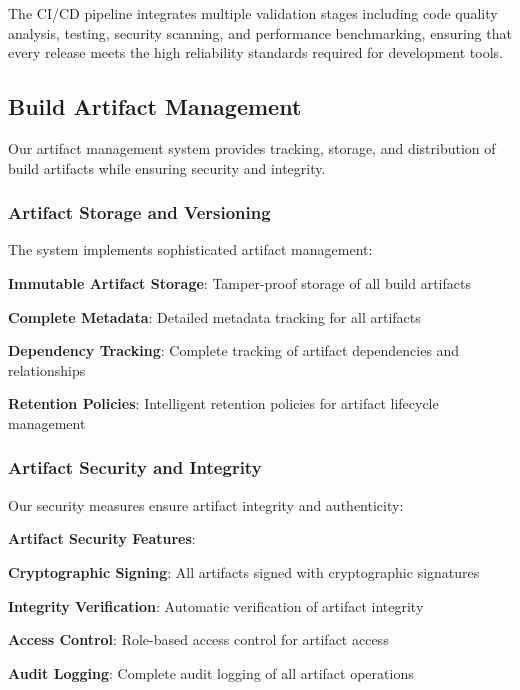 \begin{infobox}[title=CI/CD Pipeline Architecture]
The CI/CD pipeline integrates multiple validation stages including code quality analysis, testing, security scanning, and performance benchmarking, ensuring that every release meets the high reliability standards required for development tools.
\end{infobox}

\subsection*{Build Artifact Management}

Our artifact management system provides tracking, storage, and distribution of build artifacts while ensuring security and integrity.

\subsubsection*{Artifact Storage and Versioning}

The system implements sophisticated artifact management:

\begin{compactlist}
    \item \textbf{Immutable Artifact Storage}: Tamper-proof storage of all build artifacts
    \item \textbf{Complete Metadata}: Detailed metadata tracking for all artifacts
    \item \textbf{Dependency Tracking}: Complete tracking of artifact dependencies and relationships
    \item \textbf{Retention Policies}: Intelligent retention policies for artifact lifecycle management
\end{compactlist}

\subsubsection*{Artifact Security and Integrity}

Our security measures ensure artifact integrity and authenticity:

\begin{alertbox}
\textbf{Artifact Security Features}:
\begin{compactlist}
    \item \textbf{Cryptographic Signing}: All artifacts signed with cryptographic signatures
    \item \textbf{Integrity Verification}: Automatic verification of artifact integrity
    \item \textbf{Access Control}: Role-based access control for artifact access
    \item \textbf{Audit Logging}: Complete audit logging of all artifact operations
\end{compactlist}
\end{alertbox}

